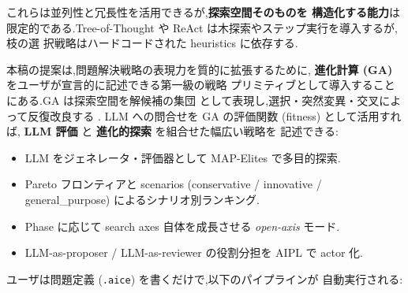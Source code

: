 \documentclass[11pt,a4paper]{article}
\newcommand{\code}[1]{\texttt{\small #1}}
\begin{document}
これらは並列性と冗長性を活用できるが,\textbf{探索空間そのものを
構造化する能力}は限定的である.Tree-of-Thought \cite{yao2023tot} や
ReAct \cite{yao2022react} は木探索やステップ実行を導入するが,枝の選
択戦略はハードコードされた heuristics に依存する.

本稿の提案は,問題解決戦略の表現力を質的に拡張するために,
\textbf{進化計算 (GA)} をユーザが宣言的に記述できる第一級の戦略
プリミティブとして導入することにある.GA は探索空間を解候補の集団
として表現し,選択・突然変異・交叉によって反復改良する \cite{holland1975ga}.
LLM への問合せを GA の評価関数 (fitness) として活用すれば,
\textbf{LLM 評価} と \textbf{進化的探索} を組合せた幅広い戦略を
記述できる:

\begin{itemize}[leftmargin=*,itemsep=0pt]
  \item LLM をジェネレータ・評価器として MAP-Elites
    \cite{mouret2015mapelites} で多目的探索.
  \item Pareto フロンティアと scenarios (conservative / innovative /
    general\_purpose) によるシナリオ別ランキング.
  \item Phase に応じて search axes 自体を成長させる
    \textit{open-axis} モード.
  \item LLM-as-proposer / LLM-as-reviewer の役割分担を AIPL で
    actor 化.
\end{itemize}

ユーザは問題定義 (\code{.aice}) を書くだけで,以下のパイプラインが
自動実行される:

\begin{center}
\end{center}
\end{document}
